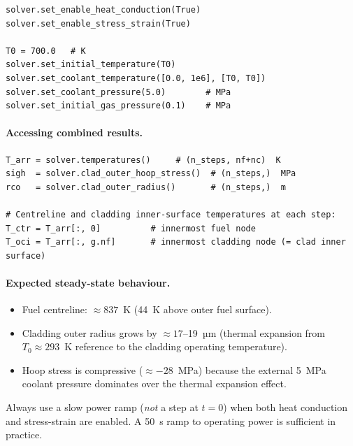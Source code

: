 \documentclass[11pt,a4paper]{article}
\begin{document}
\begin{lstlisting}
solver.set_enable_heat_conduction(True)
solver.set_enable_stress_strain(True)

T0 = 700.0   # K
solver.set_initial_temperature(T0)
solver.set_coolant_temperature([0.0, 1e6], [T0, T0])
solver.set_coolant_pressure(5.0)        # MPa
solver.set_initial_gas_pressure(0.1)    # MPa
\end{lstlisting}

\paragraph{Accessing combined results.}

\begin{lstlisting}
T_arr = solver.temperatures()     # (n_steps, nf+nc)  K
sigh  = solver.clad_outer_hoop_stress()  # (n_steps,)  MPa
rco   = solver.clad_outer_radius()       # (n_steps,)  m

# Centreline and cladding inner-surface temperatures at each step:
T_ctr = T_arr[:, 0]          # innermost fuel node
T_oci = T_arr[:, g.nf]       # innermost cladding node (= clad inner surface)
\end{lstlisting}

\paragraph{Expected steady-state behaviour.}

\begin{itemize}
  \item Fuel centreline: $\approx 837$~K (44~K above outer fuel surface).
  \item Cladding outer radius grows by $\approx 17$--19~µm (thermal expansion
        from $T_0 \approx 293$~K reference to the cladding operating temperature).
  \item Hoop stress is compressive ($\approx -28$~MPa) because the external
        5~MPa coolant pressure dominates over the thermal expansion effect.
\end{itemize}

\begin{warningbox}
  Always use a slow power ramp (\emph{not} a step at $t=0$) when both heat
  conduction and stress-strain are enabled.  A 50~s ramp to operating power
  is sufficient in practice.
\end{warningbox}

\end{document}

